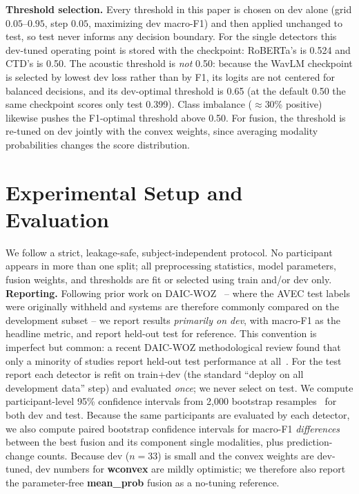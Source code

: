 \documentclass{article}
\begin{document}
\noindent\textbf{Threshold selection.} Every threshold in this paper is chosen on dev alone (grid $0.05$--$0.95$, step $0.05$, maximizing dev macro-F1) and then applied unchanged to test, so test never informs any decision boundary. For the single detectors this dev-tuned operating point is stored with the checkpoint: RoBERTa's is 0.524 and CTD's is 0.50. The acoustic threshold is \emph{not} 0.50: because the WavLM checkpoint is selected by lowest dev loss rather than by F1, its logits are not centered for balanced decisions, and its dev-optimal threshold is 0.65 (at the default 0.50 the same checkpoint scores only test 0.399). Class imbalance ($\approx$30\% positive) likewise pushes the F1-optimal threshold above 0.50. For fusion, the threshold is re-tuned on dev jointly with the convex weights, since averaging modality probabilities changes the score distribution.

\section{Experimental Setup and Evaluation}
\vspace{-1mm}
\label{sec:protocol}
We follow a strict, leakage-safe, subject-independent protocol. No participant appears in more than one split; all preprocessing statistics, model parameters, fusion weights, and thresholds are fit or selected using train and/or dev only. \textbf{Reporting.} Following prior work on DAIC-WOZ~\cite{gratch2014daic,valstar2013avec,alhanai2018detecting,wu2023ssl,li2025hierarchical} -- where the AVEC test labels were originally withheld and systems are therefore commonly compared on the development subset -- we report results \emph{primarily on dev}, with macro-F1 as the headline metric, and report held-out test for reference. This convention is imperfect but common: a recent DAIC-WOZ methodological review found that only a minority of studies report held-out test performance at all~\cite{danylenko2026pitfalls}. For the test report each detector is refit on train+dev (the standard ``deploy on all development data'' step) and evaluated \emph{once}; we never select on test. We compute participant-level 95\% confidence intervals from 2{,}000 bootstrap resamples~\cite{ferrer2024confidence} for both dev and test. Because the same participants are evaluated by each detector, we also compute paired bootstrap confidence intervals for macro-F1 \emph{differences} between the best fusion and its component single modalities, plus prediction-change counts. Because dev ($n{=}33$) is small and the convex weights are dev-tuned, dev numbers for \textbf{wconvex} are mildly optimistic; we therefore also report the parameter-free \textbf{mean\_prob} fusion as a no-tuning reference.
\end{document}
